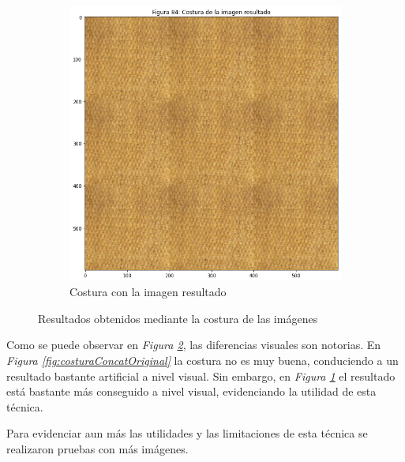 \documentclass[11pt,twoside,titlepage,a4paper]{article}
\numberwithin{equation}{section} %
\theoremstyle{usual}
\begin{document}
\begin{figure}[h]
\begin{subfigure}[t]{.3\textwidth}
        \includegraphics[width=\textwidth]{imagenes/PoissonImageEditing_cell_91_output_1.png}
        \caption{Costura con la imagen resultado}
        \label{fig:costuraImgResultado}
    \end{subfigure}
    \caption{Resultados obtenidos mediante la costura de las imágenes}
    \label{fig:resultadosConcatImagenes}
\end{figure}

Como se puede observar en \textit{Figura \ref{fig:resultadosConcatImagenes}}, las diferencias visuales son notorias. En \textit{Figura \ref{fig:costuraConcatOriginal}} la costura no es muy buena, conduciendo a un resultado bastante artificial a nivel visual. Sin embargo, en \textit{Figura \ref{fig:costuraImgResultado}} el resultado está bastante más conseguido a nivel visual, evidenciando la utilidad de esta técnica.

Para evidenciar aun más las utilidades y las limitaciones de esta técnica se realizaron pruebas con más imágenes.
\end{document}
